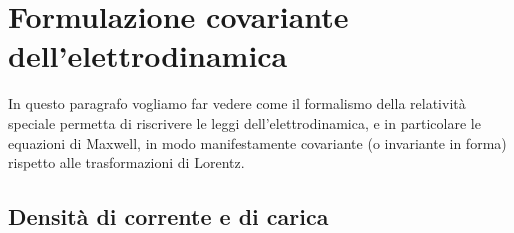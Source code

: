 \section{Formulazione covariante dell'elettrodinamica}
\label{sec:elettrodinamica-covariante}

In questo paragrafo vogliamo far vedere come il formalismo della relatività
speciale permetta di riscrivere le leggi dell'elettrodinamica, e in particolare
le equazioni di Maxwell, in modo manifestamente covariante (o invariante in
forma) rispetto alle trasformazioni di Lorentz.

\subsection{Densità di corrente e di carica}
\label{sec:densita-corrente-carica}

